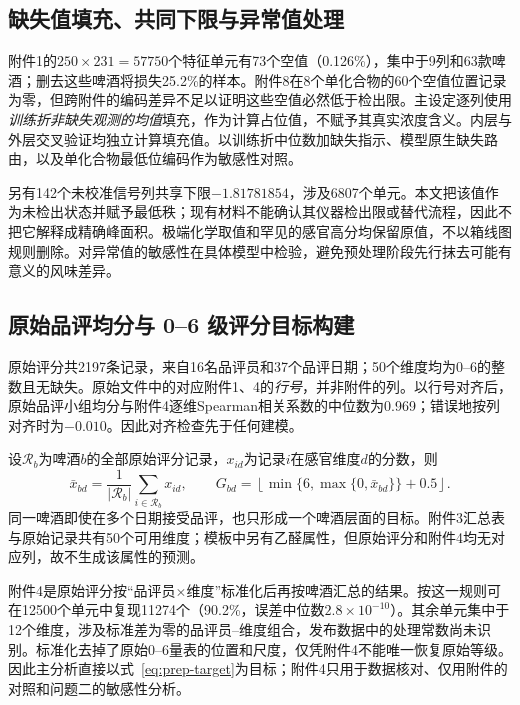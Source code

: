 \subsection{缺失值填充、共同下限与异常值处理}

附件1的$250\times231=57750$个特征单元有73个空值（0.126\%），集中于9列和63款啤酒；删去这些啤酒将损失25.2\%的样本。附件8在8个单化合物的60个空值位置记录为零，但跨附件的编码差异不足以证明这些空值必然低于检出限。主设定逐列使用\emph{训练折非缺失观测的均值}填充，作为计算占位值，不赋予其真实浓度含义。内层与外层交叉验证均独立计算填充值。以训练折中位数加缺失指示、模型原生缺失路由，以及单化合物最低位编码作为敏感性对照。

另有142个未校准信号列共享下限$-1.81781854$，涉及6807个单元。本文把该值作为未检出状态并赋予最低秩；现有材料不能确认其仪器检出限或替代流程，因此不把它解释成精确峰面积。极端化学取值和罕见的感官高分均保留原值，不以箱线图规则删除。对异常值的敏感性在具体模型中检验，避免预处理阶段先行抹去可能有意义的风味差异。

\subsection{原始品评均分与 0--6 级评分目标构建}

原始评分共2197条记录，来自16名品评员和37个品评日期；50个维度均为0--6的整数且无缺失。原始文件中的对应附件1、4的\emph{行号}，并非附件的列。以行号对齐后，原始品评小组均分与附件4逐维Spearman相关系数的中位数为0.969；错误地按列对齐时为$-0.010$。因此对齐检查先于任何建模。

设$\mathcal R_b$为啤酒$b$的全部原始评分记录，$x_{id}$为记录$i$在感官维度$d$的分数，则
\begin{equation}\label{eq:prep-target}
\bar x_{bd}=\frac{1}{|\mathcal R_b|}\sum_{i\in\mathcal R_b}x_{id},\qquad
G_{bd}=\left\lfloor\min\{6,\max\{0,\bar x_{bd}\}\}+0.5\right\rfloor .
\end{equation}
同一啤酒即使在多个日期接受品评，也只形成一个啤酒层面的目标。附件3汇总表与原始记录共有50个可用维度；模板中另有乙醛属性，但原始评分和附件4均无对应列，故不生成该属性的预测。

附件4是原始评分按“品评员$\times$维度”标准化后再按啤酒汇总的结果。按这一规则可在12500个单元中复现11274个（90.2\%，误差中位数$2.8\times10^{-10}$）。其余单元集中于12个维度，涉及标准差为零的品评员--维度组合，发布数据中的处理常数尚未识别。标准化去掉了原始0--6量表的位置和尺度，仅凭附件4不能唯一恢复原始等级。因此主分析直接以式~\eqref{eq:prep-target}为目标；附件4只用于数据核对、仅用附件的对照和问题二的敏感性分析。

